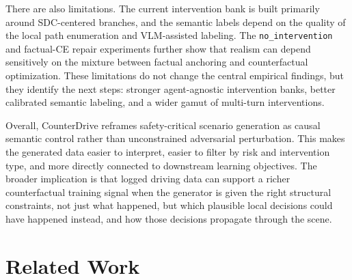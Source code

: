 \documentclass{article}
\begin{document}
There are also limitations. The current intervention bank is built primarily around SDC-centered branches, and the semantic labels depend on the quality of the local path enumeration and VLM-assisted labeling. The \texttt{no\_intervention} and factual-CE repair experiments further show that realism can depend sensitively on the mixture between factual anchoring and counterfactual optimization. These limitations do not change the central empirical findings, but they identify the next steps: stronger agent-agnostic intervention banks, better calibrated semantic labeling, and a wider gamut of multi-turn interventions.

Overall, CounterDrive reframes safety-critical scenario generation as causal semantic control rather than unconstrained adversarial perturbation. This makes the generated data easier to interpret, easier to filter by risk and intervention type, and more directly connected to downstream learning objectives. The broader implication is that logged driving data can support a richer counterfactual training signal when the generator is given the right structural constraints, not just what happened, but which plausible local decisions could have happened instead, and how those decisions propagate through the scene.

\section{Related Work}
\label{sec:related-work}
\end{document}
